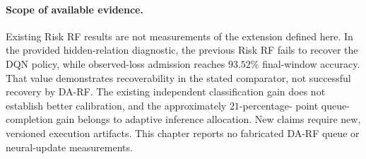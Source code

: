 \documentclass[10pt]{article}
\begin{document}
\paragraph{Scope of available evidence.}
Existing Risk RF results are not measurements of the extension defined here.
In the provided hidden-relation diagnostic, the previous Risk RF fails to recover
the DQN policy, while observed-loss admission reaches $93.52\%$ final-window
accuracy. That value demonstrates recoverability in the stated comparator,
not successful recovery by DA-RF. The existing independent classification gain
does not establish better calibration, and the approximately $21$-percentage-
point queue-completion gain belongs to adaptive inference allocation. New claims
require new, versioned execution artifacts. This chapter reports no fabricated
DA-RF queue or neural-update measurements.
\end{document}
